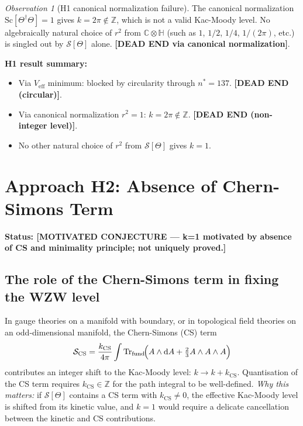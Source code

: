 \documentclass[11pt,a4paper]{article}
\theoremstyle{definition}
\theoremstyle{remark}
\newtheorem{observation}{Observation}
\begin{document}
\begin{observation}[H1 canonical normalization failure]
  \label{obs:H1_canonical}
  The canonical normalization $\mathrm{Sc}[\Theta^\dagger\Theta] = 1$
  gives $k = 2\pi \notin \mathbb{Z}$, which is not a valid
  Kac-Moody level.
  No algebraically natural choice of $r^2$ from $\mathbb{C}\otimes\mathbb{H}$
  (such as $1$, $1/2$, $1/4$, $1/(2\pi)$, etc.) is
  singled out by $\mathcal{S}[\Theta]$ alone.
  \textbf{[DEAD END via canonical normalization]}.
\end{observation}

\textbf{H1 result summary:}
\begin{itemize}
  \item Via $V_{\mathrm{eff}}$ minimum:
    blocked by circularity through $n^* = 137$.
    \textbf{[DEAD END (circular)]}.
  \item Via canonical normalization $r^2 = 1$:
    $k = 2\pi \notin \mathbb{Z}$.
    \textbf{[DEAD END (non-integer level)]}.
  \item No other natural choice of $r^2$ from $\mathcal{S}[\Theta]$
    gives $k = 1$.
\end{itemize}

\section{Approach H2: Absence of Chern-Simons Term}
\label{sec:H2}

\textbf{Status: [MOTIVATED CONJECTURE — k=1 motivated by absence of CS
and minimality principle; not uniquely proved.]}

\subsection{The role of the Chern-Simons term in fixing the WZW level}

In gauge theories on a manifold with boundary, or in topological field
theories on an odd-dimensional manifold, the Chern-Simons (CS) term
\begin{equation}
  \mathcal{S}_{\mathrm{CS}}
  = \frac{k_{\mathrm{CS}}}{4\pi}
    \int \mathrm{Tr}_{\mathrm{fund}}\!\Bigl(A \wedge \mathrm{d}A
      + \tfrac{2}{3} A \wedge A \wedge A\Bigr)
  \label{eq:CS_action}
\end{equation}
contributes an integer shift to the Kac-Moody level: $k \to k + k_{\mathrm{CS}}$.
Quantisation of the CS term requires $k_{\mathrm{CS}} \in \mathbb{Z}$ for
the path integral to be well-defined.
\textit{Why this matters:} if $\mathcal{S}[\Theta]$ contains a CS term with
$k_{\mathrm{CS}} \neq 0$, the effective Kac-Moody level is shifted
from its kinetic value, and $k = 1$ would require a delicate
cancellation between the kinetic and CS contributions.
\end{document}
